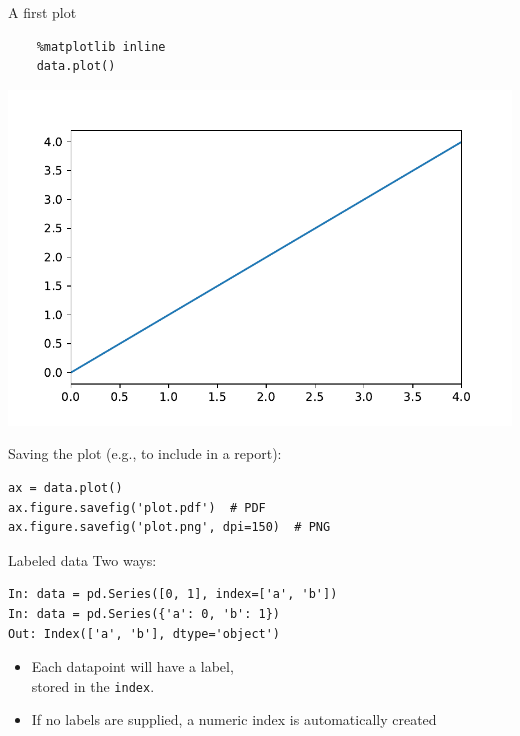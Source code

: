 \documentclass[aspectratio=169,usenames,dvipsnames]{beamer}
\begin{document}
\begin{frame}[fragile]{A first plot}
    \begin{lstlisting}
    %matplotlib inline
    data.plot()
    \end{lstlisting}
    \includegraphics[height=0.5\textheight]{fig/basicplot}
    \pause

Saving the plot (e.g., to include in a report):
\begin{lstlisting}
ax = data.plot()
ax.figure.savefig('plot.pdf')  # PDF
ax.figure.savefig('plot.png', dpi=150)  # PNG
\end{lstlisting}
\end{frame}

\begin{frame}[fragile]{Labeled data}
Two ways:
\begin{lstlisting}
In: data = pd.Series([0, 1], index=['a', 'b'])
In: data = pd.Series({'a': 0, 'b': 1})
Out: Index(['a', 'b'], dtype='object')
\end{lstlisting}

\begin{itemize}
    \item Each datapoint will have a label, \\
        stored in the \texttt{index}.
    \item If no labels are supplied, a numeric index is automatically created
\end{itemize}
\end{frame}
\end{document}
